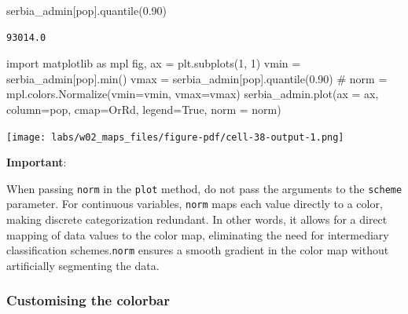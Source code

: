 \documentclass[
  letterpaper,
  DIV=11,
  numbers=noendperiod]{scrreprt}
\newenvironment{Shaded}{\begin{snugshade}}{\end{snugshade}}
\newcommand{\BuiltInTok}[1]{\textcolor[rgb]{0.00,0.23,0.31}{#1}}
\newcommand{\CommentTok}[1]{\textcolor[rgb]{0.37,0.37,0.37}{#1}}
\newcommand{\DecValTok}[1]{\textcolor[rgb]{0.68,0.00,0.00}{#1}}
\newcommand{\FloatTok}[1]{\textcolor[rgb]{0.68,0.00,0.00}{#1}}
\newcommand{\ImportTok}[1]{\textcolor[rgb]{0.00,0.46,0.62}{#1}}
\newcommand{\NormalTok}[1]{\textcolor[rgb]{0.00,0.23,0.31}{#1}}
\newcommand{\OperatorTok}[1]{\textcolor[rgb]{0.37,0.37,0.37}{#1}}
\newcommand{\StringTok}[1]{\textcolor[rgb]{0.13,0.47,0.30}{#1}}
\newcommand{\VariableTok}[1]{\textcolor[rgb]{0.07,0.07,0.07}{#1}}
\begin{document}
\begin{Shaded}
\begin{Highlighting}[]
\NormalTok{serbia\_admin[}\StringTok{\textquotesingle{}pop\textquotesingle{}}\NormalTok{].quantile(}\FloatTok{0.90}\NormalTok{)}
\end{Highlighting}
\end{Shaded}

\begin{verbatim}
93014.0
\end{verbatim}

\begin{Shaded}
\begin{Highlighting}[]
\ImportTok{import}\NormalTok{ matplotlib }\ImportTok{as}\NormalTok{ mpl}
\NormalTok{fig, ax }\OperatorTok{=}\NormalTok{ plt.subplots(}\DecValTok{1}\NormalTok{, }\DecValTok{1}\NormalTok{)}
\NormalTok{vmin }\OperatorTok{=}\NormalTok{ serbia\_admin[}\StringTok{\textquotesingle{}pop\textquotesingle{}}\NormalTok{].}\BuiltInTok{min}\NormalTok{()}
\NormalTok{vmax }\OperatorTok{=}\NormalTok{ serbia\_admin[}\StringTok{\textquotesingle{}pop\textquotesingle{}}\NormalTok{].quantile(}\FloatTok{0.90}\NormalTok{) }\CommentTok{\# }
\NormalTok{norm }\OperatorTok{=}\NormalTok{ mpl.colors.Normalize(vmin}\OperatorTok{=}\NormalTok{vmin, vmax}\OperatorTok{=}\NormalTok{vmax)}
\NormalTok{serbia\_admin.plot(ax }\OperatorTok{=}\NormalTok{ ax, column}\OperatorTok{=}\StringTok{\textquotesingle{}pop\textquotesingle{}}\NormalTok{, cmap}\OperatorTok{=}\StringTok{\textquotesingle{}OrRd\textquotesingle{}}\NormalTok{, legend}\OperatorTok{=}\VariableTok{True}\NormalTok{, norm }\OperatorTok{=}\NormalTok{ norm)}
\end{Highlighting}
\end{Shaded}

\texttt{[image: labs/w02\_maps\_files/figure-pdf/cell-38-output-1.png]}

\textbf{Important}:

When passing \texttt{norm} in the \texttt{plot} method, do not pass the
arguments to the \texttt{scheme} parameter. For continuous variables,
\texttt{norm} maps each value directly to a color, making discrete
categorization redundant. In other words, it allows for a direct mapping
of data values to the color map, eliminating the need for intermediary
classification schemes.\texttt{norm} ensures a smooth gradient in the
color map without artificially segmenting the data.

\subsubsection{Customising the colorbar}\label{customising-the-colorbar}
\end{document}
